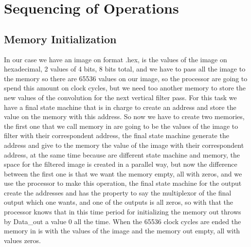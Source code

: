 \documentclass[11pt,a4paper]{article}
\begin{document}

\section{Sequencing of Operations}
\subsection{Memory Initialization}
In our case we have an image on format .hex, is the values of the image on hexadecimal, 2 values of 4 bits, 8 bits total, and we have to pass all the image to the memory so there are 65536 values on our image, so the processor are going to spend this amount on clock cycles, but we need too another memory to store the new values of the convolution for the next vertical filter pass. For this task we have a final state machine that is in charge to create an address and store the value on the memory with this address. So now we have to create two memories, the first one that we call memory in are going to be the values of the image to filter with their correspondent address, the final state machine generate the address and give to the memory the value of the image with their correspondent address, at the same time because are different state machine and memory, the space for the filtered image is created in a parallel way, but now the difference between the first one is that we want the memory empty, all with zeros, and we use the processor to make this operation, the final state machine for the output create the addresses and has the property to say the multiplexor of the final output which one wants, and one of the outputs is all zeros, so with that the processor knows that in this time period for initializing the memory out throws by Data_out a value 0 all the time.
When the 65536 clock cycles are ended the memory in is with the values of the image and the memory out empty, all with values zeros.	
\end{document}
